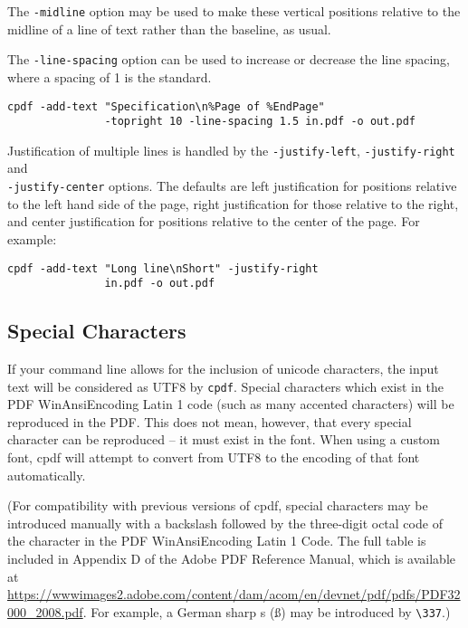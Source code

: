 \documentclass{book}
\begin{document}
\noindent The \texttt{-midline} option may be used to make these vertical positions
relative to the midline of a line of text rather than the baseline, as usual.

The \texttt{-line-spacing} option can be used to increase or decrease the line
spacing, where a spacing of 1 is the standard.

  \begin{framed}
    \small\begin{verbatim}cpdf -add-text "Specification\n%Page of %EndPage"
               -topright 10 -line-spacing 1.5 in.pdf -o out.pdf\end{verbatim}
  \end{framed}

\noindent Justification of multiple lines is handled by the \texttt{-justify-left}, 
\texttt{-justify-right} and\\ \texttt{-justify-center} options. The defaults are
left justification for positions relative to the left hand side of the page,
right justification for those relative to the right, and center justification
for positions relative to the center of the page. For example:

\begin{framed}
  \small\begin{verbatim}cpdf -add-text "Long line\nShort" -justify-right
               in.pdf -o out.pdf\end{verbatim}
\end{framed}

\subsection{Special Characters}

If your command line allows for the inclusion of unicode characters, the input
text will be considered as UTF8 by \verb!cpdf!. Special characters which exist
in the PDF WinAnsiEncoding Latin 1 code (such as many accented characters) will
be reproduced in the PDF. This does not mean, however, that every special
character can be reproduced -- it must exist in the font. When using a custom font, cpdf will attempt to convert from UTF8 to the encoding of that font automatically.

(For compatibility with previous versions of cpdf, special characters may be
introduced manually with a backslash followed by the three-digit octal code of
the character in the PDF WinAnsiEncoding Latin 1 Code. The full table is
included in Appendix D of the Adobe PDF Reference Manual, which is available at
\url{https://wwwimages2.adobe.com/content/dam/acom/en/devnet/pdf/pdfs/PDF32000_2008.pdf}. For example, a German sharp s (\ss) may be introduced by \verb!\337!.)
\end{document}
